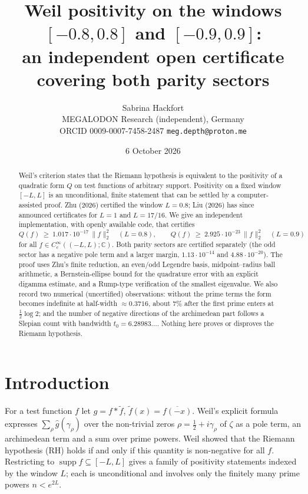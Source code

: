 \documentclass[11pt,a4paper]{article}
\title{Weil positivity on the windows $[-0.8,0.8]$ and $[-0.9,0.9]$:\\
an independent open certificate covering both parity sectors}
\author{Sabrina Hackfort\\[2pt]
\small MEGALODON Research (independent), Germany\\
\small ORCID 0009-0007-7458-2487 \quad \texttt{meg.depth@proton.me}}
\date{6 October 2026}
\theoremstyle{remark}
\theoremstyle{definition}
\begin{document}
\maketitle

\begin{abstract}
Weil's criterion states that the Riemann hypothesis is equivalent to the positivity of a quadratic form $Q$ on test functions of arbitrary support. Positivity on a fixed window $[-L,L]$ is an unconditional, finite statement that can be settled by a computer-assisted proof. Zhu (2026) certified the window $L=0.8$; Liu (2026) has since announced certificates for $L=1$ and $L=17/16$. We give an independent implementation, with openly available code, that certifies
\[
Q(f)\ \ge\ 1.017\cdot10^{-17}\,\|f\|_2^2 \quad (L=0.8),\qquad
Q(f)\ \ge\ 2.925\cdot10^{-23}\,\|f\|_2^2 \quad (L=0.9)
\]
for all $f\in C_c^\infty((-L,L);\mathbb C)$. Both parity sectors are certified separately (the odd sector has a negative pole term and a larger margin, $1.13\cdot10^{-14}$ and $4.88\cdot10^{-20}$). The proof uses Zhu's finite reduction, an even/odd Legendre basis, midpoint–radius ball arithmetic, a Bernstein-ellipse bound for the quadrature error with an explicit digamma estimate, and a Rump-type verification of the smallest eigenvalue. We also record two numerical (uncertified) observations: without the prime terms the form becomes indefinite at half-width $\approx0.3716$, about $7\%$ after the first prime enters at $\tfrac12\log2$; and the number of negative directions of the archimedean part follows a Slepian count with bandwidth $t_0=6.28983\ldots$. Nothing here proves or disproves the Riemann hypothesis.
\end{abstract}

\section{Introduction}

For a test function $f$ let $g=f*\tilde f$, $\tilde f(x)=\overline{f(-x)}$. Weil's explicit formula expresses $\sum_\rho \hat g(\gamma_\rho)$ over the non-trivial zeros $\rho=\tfrac12+i\gamma_\rho$ of $\zeta$ as a pole term, an archimedean term and a sum over prime powers. Weil \cite{Weil52} showed that the Riemann hypothesis (RH) holds if and only if this quantity is non-negative for all $f$. Restricting to $\operatorname{supp} f\subseteq[-L,L]$ gives a family of positivity statements indexed by the window $L$; each is unconditional and involves only the finitely many prime powers $n<e^{2L}$.
\end{document}
